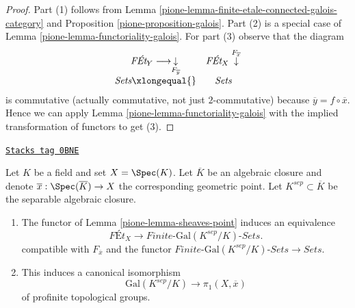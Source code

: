 \begin{proof}

Part (1) follows from Lemma \ref{pione-lemma-finite-etale-connected-galois-category}
and Proposition \ref{pione-proposition-galois}.
Part (2) is a special case of Lemma \ref{pione-lemma-functoriality-galois}.
For part (3) observe that the diagram
$$
\begin{array}{cc}\textit{F\'Et}_Y \longrightarrow\underset{F_{\overline{y}}}{\downarrow} & \textit{F\'Et}_X \overset{F_{\overline{x}}}{\downarrow} \\ \textit{Sets} \xlongequal{} & \textit{Sets}\end{array}
$$
is commutative (actually commutative, not just $2$-commutative) because
$\overline{y} = f \circ \overline{x}$. Hence
we can apply Lemma \ref{pione-lemma-functoriality-galois} with the implied
transformation of functors to get (3).
\end{proof}

\begin{lemma}
\label{pione-lemma-fundamental-group-Galois-group}
\href{https://stacks.math.columbia.edu/tag/0BNE}{\texttt{Stacks tag 0BNE}}

Let $K$ be a field and set $X = \Spec(K)$. Let $\overline{K}$ be an
algebraic closure and denote $\overline{x} : \Spec(\overline{K}) \to X$
the corresponding geometric point. Let $K^{sep} \subset \overline{K}$
be the separable algebraic closure.
\begin{enumerate}
\item The functor of Lemma \ref{pione-lemma-sheaves-point} induces an equivalence
$$
\textit{F\'Et}_X \longrightarrow
\textit{Finite-}\text{Gal}(K^{sep}/K)\textit{-Sets}.
$$
compatible with $F_{\overline{x}}$ and the functor
$\textit{Finite-}\text{Gal}(K^{sep}/K)\textit{-Sets} \to \textit{Sets}$.
\item This induces a canonical isomorphism
$$
\text{Gal}(K^{sep}/K) \longrightarrow \pi_1(X, \overline{x})
$$
of profinite topological groups.
\end{enumerate}
\end{lemma}


